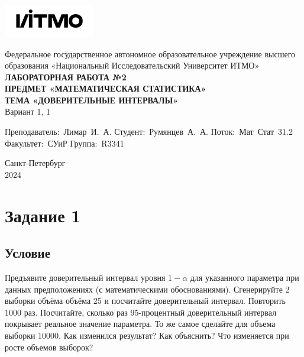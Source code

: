 \documentclass[a4paper, 12pt]{article}
\begin{document}
    \begin{titlepage}

        \begin{center}
        \includegraphics[width=0.3\textwidth]{itmo.png} %
        \vfill
        
        Федеральное государственное автономное образовательное учреждение высшего образования
        «Национальный Исследовательский Университет ИТМО»\\
        
        \vfill
        {\large\bf ЛАБОРАТОРНАЯ РАБОТА №2}\\
        {\large\bf ПРЕДМЕТ «МАТЕМАТИЧЕСКАЯ СТАТИСТИКА»}\\
        {\large\bf ТЕМА «ДОВЕРИТЕЛЬНЫЕ ИНТЕРВАЛЫ»}\\
        Вариант 1, 1
        \vfill

        \begin{flushright}
            \begin{minipage}{.45\textwidth}
            {
                \hbox{Преподаватель: Лимар И. А.}
                \hbox{Студент: Румянцев А. А.}
                \hbox{Поток: Мат Стат 31.2}
                \hbox{}
                \hbox{Факультет: СУиР}
                \hbox{Группа: R3341}
            }
            \end{minipage}
        \end{flushright}
        
        \vfill
                
        Санкт-Петербург\\
        2024
        \end{center}
    \end{titlepage}
    
    \tableofcontents

    \newpage
    \section{Задание 1}
    \subsection{Условие}
    Предъявите доверительный интервал уровня $1-\alpha$ для указанного параметра при данных
    предположениях (с математическими обоснованиями). Сгенерируйте 2 выборки объёма объёма
    25 и посчитайте доверительный интервал. Повторить 1000 раз. Посчитайте, сколько раз 
    95-процентный доверительный интервал покрывает реальное значение параметра. То же самое
    сделайте для объема выборки 10000. Как изменился результат? Как объяснить? Что изменяется
    при росте объемов выборок?
\end{document}
